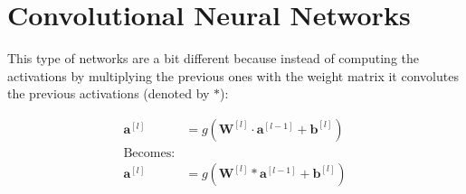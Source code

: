 \section{Convolutional Neural Networks}
\begin{frame}{\insertsec}
    This type of networks are a bit different because instead of computing the activations by
    multiplying the previous ones with the weight matrix it convolutes the previous activations 
    (denoted by $*$):
    
    \begin{align*}
        \bm{a}^{[l]} &= g(\bm{W}^{[l]}\cdot \bm{a}^{[l - 1]} + \bm{b}^{[l]}) \\
        \text{Becomes:} \\
        \bm{a}^{[l]} &= g(\bm{W}^{[l]} * \bm{a}^{[l-1]} + \bm{b}^{[l]})
    \end{align*}
\end{frame}

